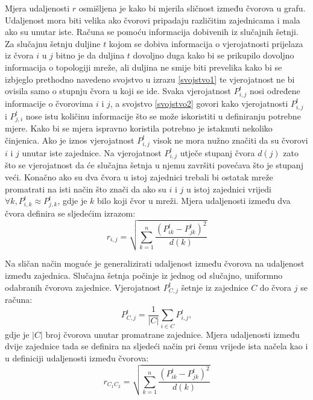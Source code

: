 \documentclass[times, utf8, diplomski]{fer}
\begin{document}
Mjera udaljenosti $r$ osmišljena je kako bi mjerila sličnost između čvorova u grafu. Udaljenost mora biti velika ako čvorovi pripadaju različitim zajednicama i mala ako su unutar iste. Računa se pomoću informacija dobivenih iz slučajnih šetnji. Za slučajnu šetnju duljine $t$ kojom se dobiva informacija o vjerojatnosti prijelaza iz čvora $i$ u $j$ bitno je da duljina $t$ dovoljno duga kako bi se prikupilo dovoljno informacija o topologiji mreže, ali duljina ne smije biti prevelika kako bi se izbjeglo prethodno navedeno svojstvo u izrazu \ref{svojstvo1} te vjerojatnost ne bi ovisila samo o stupnju čvora u koji se ide. Svaka vjerojatnost $P_{i,j}^{t}$ nosi određene informacije o čvorovima $i$ i $j$, a svojstvo \ref{svojstvo2} govori kako vjerojatnosti $P_{i,j}^{t}$ i $P_{j,i}^{t}$ nose istu količinu informacije što se može iskoristiti u definiranju potrebne mjere. Kako bi se mjera ispravno koristila potrebno je istaknuti nekoliko činjenica. Ako je iznos vjerojatnost $P_{i,j}^{t}$ visok ne mora nužno značiti da su čvorovi $i$ i $j$ unutar iste zajednice. Na vjerojatnost $P_{i,j}^{t}$ utječe stupanj čvora $d(j)$ zato što se vjerojatnost da će slučajna šetnja u njemu završiti povećava što je stupanj veći. Konačno ako su dva čvora u istoj zajednici trebali bi ostatak mreže promatrati na isti način što znači da ako su $i$ i $j$ u istoj zajednici vrijedi $\forall k, P_{i,k}^{t} \approx P_{j,k}^{t}$, gdje je $k$ bilo koji čvor u mreži. Mjera udaljenosti između dva čvora definira se sljedećim izrazom:
\begin{equation}
	r_{i,j} = \sqrt{\sum_{k=1}^{n} \frac{(P_{ik}^{t} - P_{jk}^{t})^{2}}{d(k)}}
\end{equation}

Na sličan način moguće je generalizirati udaljenost između čvorova na udaljenost između zajednica. Slučajna šetnja počinje iz jednog od slučajno, uniformno odabranih čvorova zajednice. Vjerojatnost $P^{t}_{C,j}$ šetnje iz zajednice $C$ do čvora $j$ se računa:
\begin{equation}
	P^{t}_{C,j} = \frac{1}{|C|} \sum_{i \in C} P^{t}_{i,j},
\end{equation}
gdje je $|C|$ broj čvorova unutar promatrane zajednice. Mjera udaljenosti između dvije zajednice tada se definira na sljedeći način pri čemu vrijede ista načela kao i u definiciji udaljenosti između čvorova:
\begin{equation}
	r_{C_{1}C_{2}} = \sqrt{\sum_{k=1}^{n} \frac{(P_{ik}^{t} - P_{jk}^{t})^{2}} {d(k)}}
\end{equation}
\end{document}
